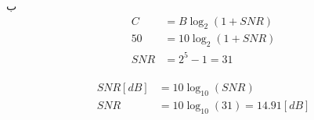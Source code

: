 \SubProblem
{ب}
{
\begin{equation*}
\begin{aligned}
    C   & = B\log_2(1+SNR)\\
    50  & = 10\log_2(1+SNR)\\
    SNR & = 2^5 - 1 = 31
\end{aligned}
\end{equation*}
\\
\begin{equation*}
\begin{aligned}
    SNR[dB] & = 10\log_{10}(SNR)\\
    SNR     & = 10\log_{10}(31) = 14.91 [dB]
\end{aligned}
\end{equation*}
}
